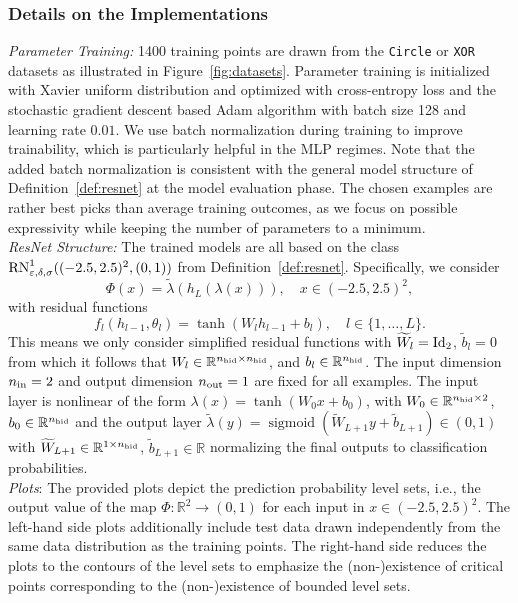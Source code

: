 \documentclass[10pt]{article}
\theoremstyle{definition}
\numberwithin{equation}{section}
\newcommand{\eps}{\varepsilon}
\newcommand{\R}{\mathbb{R}}
\newcommand*{\nout}{n_\textup{out}}
\newcommand*{\nhid}{n_\textup{hid}}
\newcommand*{\nin}{n_\textup{in}}
\newcommand{\Wt}{\widetilde{W}}
\newcommand{\bt}{\tilde{b}}
\begin{document}
\subsubsection{Details on the Implementations}

\noindent \emph{Parameter Training:} 1400 training points are drawn from the \texttt{Circle} or \texttt{XOR} datasets as illustrated in Figure~\ref{fig:datasets}. Parameter training is initialized with Xavier uniform distribution and optimized with cross-entropy loss and the stochastic gradient descent based Adam algorithm with batch size 128 and learning rate $0.01$. We use batch normalization during training to improve trainability, which is particularly helpful in the MLP regimes. Note that the added batch normalization is consistent with the general model structure of Definition~\ref{def:resnet} at the model evaluation phase. The chosen examples are rather best picks than average training outcomes, as we focus on possible expressivity while keeping the number of parameters to a minimum.\\

\noindent \emph{ResNet Structure:} The trained models are all based on the class $\textup{RN}_{\eps,\delta, \sigma}^1((-2.5,2.5)^2, (0,1))$ from Definition~\ref{def:resnet}. Specifically, we consider 
\begin{equation}\label{eq:2dphi}
        \Phi(x) = \tilde{\lambda}(h_L(\lambda(x))), \quad x\in(-2.5,2.5)^2,
    \end{equation}
    with residual functions
    \begin{equation}\label{eq:2dresfun}
        f_l(h_{l-1}, \theta_l) = \tanh(W_l h_{l-1} + b_l), \quad l\in \{1,\ldots, L\}.
    \end{equation}
    This means we only consider simplified residual functions with $\Wt_ l = \textup{Id}_{2}$, $\bt_l = 0$ from which it follows that $W_l \in \R^{\nhid \times \nhid}$, and $b_l \in \R^{\nhid}$. The input dimension $\nin = 2$ and output dimension $\nout = 1$ are fixed for all examples. The input layer is nonlinear of the form $\lambda(x) = \tanh(W_0 x + b_0)$, with $W_0 \in \R^{\nhid \times 2}$, $b_0 \in \R^{\nhid}$ and the output layer $\tilde{\lambda}(y) = \operatorname{sigmoid} (\Wt_{L+1} y + \bt_{L+1})\in (0,1)$ with $\Wt_{L+1} \in \R^{1\times \nhid}$, $\bt_{L+1} \in \R$ normalizing the final outputs to classification probabilities.
    \\

    \noindent \emph{Plots}: The provided plots depict the prediction probability level sets, i.e., the output value of the map $\Phi :\R^{2} \to (0,1)$ for each input in $x\in (-2.5, 2.5)^2$. The left-hand side plots additionally include test data drawn independently from the same data distribution as the training points. The right-hand side reduces the plots to the contours of the level sets to emphasize the (non-)existence of critical points corresponding to the (non-)existence of bounded level sets.
\end{document}
